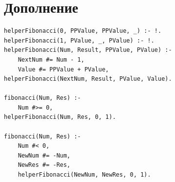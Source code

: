 \chapter {Дополнение}

\begin{lstlisting}[caption=Swift Prolog: Число Фибоначи]
helperFibonacci(0, PPValue, PPValue, _) :- !.
helperFibonacci(1, PValue, _, PValue) :- !.
helperFibonacci(Num, Result, PPValue, PValue) :-   
	NextNum #= Num - 1,
	Value #= PPValue + PValue,
helperFibonacci(NextNum, Result, PValue, Value).

fibonacci(Num, Res) :-
	Num #>= 0,
helperFibonacci(Num, Res, 0, 1).

fibonacci(Num, Res) :-
	Num #< 0,
	NewNum #= -Num,
	NewRes #= -Res,
	helperFibonacci(NewNum, NewRes, 0, 1).
\end{lstlisting}

